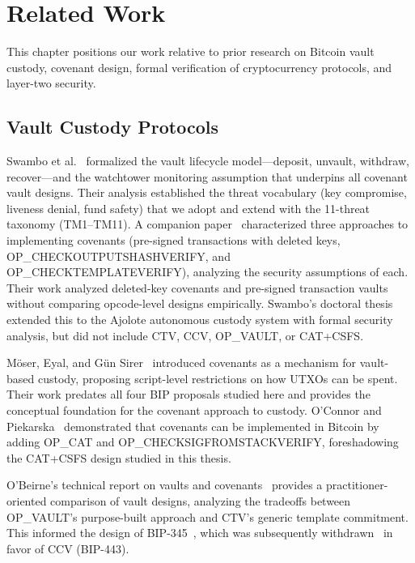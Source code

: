 \chapter{Related Work} \label{ch:related}

This chapter positions our work relative to prior research on Bitcoin vault custody,
covenant design, formal verification of cryptocurrency protocols, and layer-two
security.

\section{Vault Custody Protocols} \label{se:rw_vault_custody}

Swambo et al.~\cite{SHMB20} formalized the vault lifecycle model---deposit, unvault,
withdraw, recover---and the watchtower monitoring assumption that underpins all
covenant vault designs. Their analysis established the threat vocabulary (key
compromise, liveness denial, fund safety) that we adopt and extend with the
11-threat taxonomy (TM1--TM11). A companion paper~\cite{SBMB20} characterized three
approaches to implementing covenants (pre-signed transactions with deleted keys,
OP\_CHECKOUTPUTSHASHVERIFY, and OP\_CHECKTEMPLATEVERIFY), analyzing the security
assumptions of each. Their work analyzed deleted-key covenants and pre-signed
transaction vaults without comparing opcode-level designs empirically. Swambo's
doctoral thesis~\cite{Swa23} extended this to the Ajolote autonomous custody system
with formal security analysis, but did not include CTV, CCV, OP\_VAULT, or
CAT+CSFS.

M\"oser, Eyal, and G\"un Sirer~\cite{MES16} introduced covenants as a mechanism for
vault-based custody, proposing script-level restrictions on how UTXOs can be spent.
Their work predates all four BIP proposals studied here and provides the conceptual
foundation for the covenant approach to custody. O'Connor and
Piekarska~\cite{OP17} demonstrated that covenants can be implemented in Bitcoin by
adding OP\_CAT and OP\_CHECKSIGFROMSTACKVERIFY, foreshadowing the CAT+CSFS design
studied in this thesis.

O'Beirne's technical report on vaults and covenants~\cite{OBeirne23} provides a
practitioner-oriented comparison of vault designs, analyzing the tradeoffs between
OP\_VAULT's purpose-built approach and CTV's generic template commitment. This
informed the design of BIP-345~\cite{BIP345}, which was subsequently
withdrawn~\cite{OB25} in favor of CCV (BIP-443).

